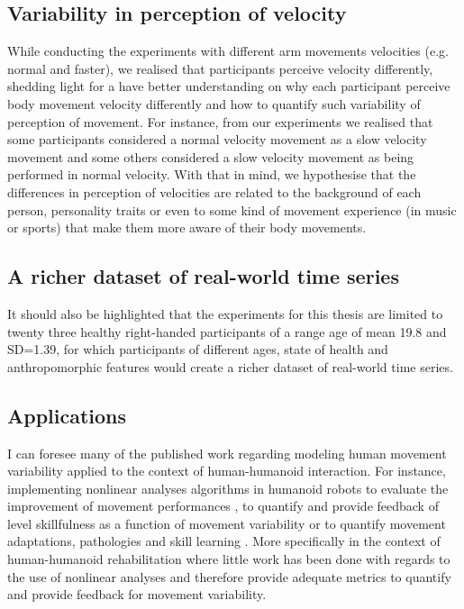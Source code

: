 \subsection*{Variability in perception of velocity}
While conducting the experiments with different arm movements 
velocities (e.g. normal and faster), we realised that participants 
perceive velocity differently, shedding light for a have better 
understanding on why each participant perceive body movement velocity 
differently and how to quantify such variability of perception of movement.
For instance, from our experiments we realised that some participants 
considered a normal velocity movement as a slow velocity movement and 
some others considered a slow velocity movement as being performed 
in normal velocity. 
With that in mind, we hypothesise that the differences in perception of 
velocities are related to the background of each person,
personality traits or even to some kind of movement experience 
(in music or sports) that make them more aware of their body 
movements. %

\subsection*{A richer dataset of real-world time series}
It should also be highlighted that the experiments for this thesis are 
limited to twenty three healthy right-handed participants of a 
range age of mean 19.8 and SD=1.39, for which participants of 
different ages, state of health and anthropomorphic features 
would create a richer dataset of real-world time series.


\subsection*{Applications}
I can foresee many of the published work regarding modeling human movement 
variability applied to the context of human-humanoid interaction.
For instance, implementing nonlinear analyses algorithms in humanoid robots 
to evaluate the improvement of movement performances \citep{muller2004}, 
to quantify and provide feedback of level skillfulness as a function 
of movement variability \citep{seifert2011} or to quantify movement 
adaptations, pathologies and skill learning 
\citep{preatoni2007, preatoni2010, preatoni2013}.
More specifically in the context of human-humanoid rehabilitation 
where little work has been done \citep{gorer2013, guneysu2015}
with regards to the use of nonlinear analyses and therefore 
provide adequate metrics to quantify and provide feedback 
for movement variability. 


